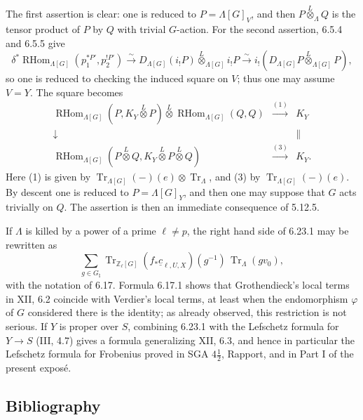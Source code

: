 \documentclass[11pt]{article}
\theoremstyle{plain}
\theoremstyle{definition}
\theoremstyle{remark}
\newcommand{\bZ}{\mathbb Z}
\DeclareMathOperator{\Tr}{Tr}
\DeclareMathOperator{\RHom}{RHom}
\begin{document}
The first assertion is clear: one is reduced to $P=\Lambda[G]_V$, and then
$P\overset{L}{\otimes}_\Lambda Q$ is the tensor product of $P$ by $Q$ with trivial
$G$-action. For the second assertion, 6.5.4 and 6.5.5 give
\[
\delta^*\RHom_{\Lambda[G]}(p_1^{*P'},p_2^{!P'})
\xrightarrow{\sim}
D_{\Lambda[G]}(i_!P)\overset{L}{\otimes}_{\Lambda[G]}i_!P
\xrightarrow{\sim}
i_!(D_{\Lambda[G]}P\overset{L}{\otimes}_{\Lambda[G]}P),
\]
so one is reduced to checking the induced square on $V$; thus one may assume
$V=Y$. The square becomes
\[
\begin{array}{ccc}
\RHom_{\Lambda[G]}(P,K_Y\overset{L}{\otimes}P)
\overset{L}{\otimes}\RHom_{\Lambda[G]}(Q,Q)&\xrightarrow{(1)}&K_Y\\[8pt]
\downarrow && \parallel\\[8pt]
\RHom_{\Lambda[G]}(P\overset{L}{\otimes}Q,
K_Y\overset{L}{\otimes}P\overset{L}{\otimes}Q)&\xrightarrow{(3)}&K_Y.
\end{array}
\]
Here (1) is given by $\Tr_{\Lambda[G]}(-)(e)\otimes\Tr_\Lambda$, and (3) by
$\Tr_{\Lambda[G]}(-)(e)$. By descent one is reduced to
$P=\Lambda[G]_Y$, and then one may suppose that $G$ acts trivially on $Q$. The
assertion is then an immediate consequence of 5.12.5.

If $\Lambda$ is killed by a power of a prime $\ell\ne p$, the right hand side of
6.23.1 may be rewritten as
\[
\sum_{g\in G_\natural}
\Tr_{\bZ_\ell[G]}(f_*\underline c_{\ell,U,X})(g^{-1})\,\Tr_\Lambda(gv_0),
\]
with the notation of 6.17. Formula 6.17.1 shows that Grothendieck's local terms in
XII, 6.2 coincide with Verdier's local terms, at least when the endomorphism
$\varphi$ of $G$ considered there is the identity; as already observed, this
restriction is not serious. If $Y$ is proper over $S$, combining 6.23.1 with the
Lefschetz formula for $Y\to S$ (III, 4.7) gives a formula generalizing XII, 6.3,
and hence in particular the Lefschetz formula for Frobenius proved in SGA
$4\frac12$, Rapport, and in Part I of the present exposé.

\subsection*{Bibliography}
\end{document}
